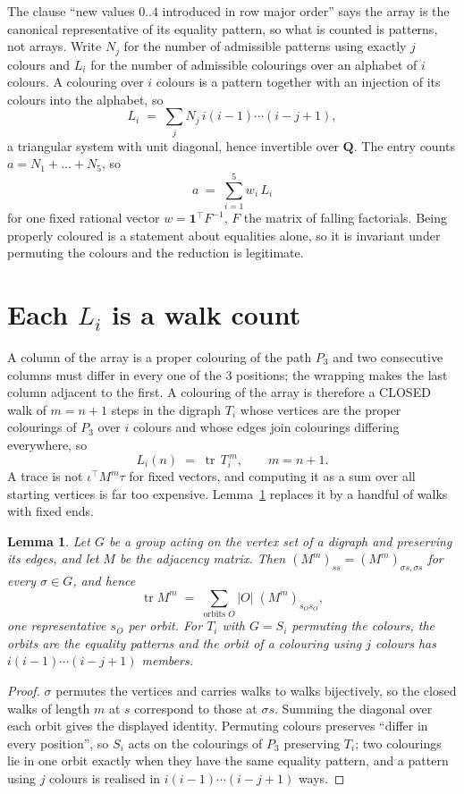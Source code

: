 \documentclass[11pt,a4paper]{article}
\theoremstyle{plain}
\newtheorem{lemma}[theorem]{Lemma}
\theoremstyle{definition}
\begin{document}
The clause ``new values $0..4$ introduced in row major order'' says the array is the
canonical representative of its equality pattern, so what is counted is patterns, not arrays.
Write $N_j$ for the number of admissible patterns using exactly $j$ colours and $L_i$ for the
number of admissible colourings over an alphabet of $i$ colours. A colouring over $i$ colours
is a pattern together with an injection of its colours into the alphabet, so
\[
L_i\;=\;\sum_j N_j\,i(i-1)\cdots(i-j+1),
\]
a triangular system with unit diagonal, hence invertible over $\mathbf{Q}$. The entry counts
$a=N_1+\dots+N_{5}$, so
\[
a\;=\;\sum_{i=1}^{5}w_i\,L_i
\]
for one fixed rational vector $w=\mathbf{1}^{\!\top}F^{-1}$, $F$ the matrix of falling
factorials. Being properly coloured is a statement about equalities alone, so it is invariant
under permuting the colours and the reduction is legitimate.

\section{Each $L_i$ is a walk count}

A column of the array is a proper colouring of the path $P_{3}$ and two consecutive
columns must differ in every one of the $3$ positions; the wrapping makes the last column
adjacent to the first. A colouring of the array is therefore a CLOSED walk of $m=n+1$ steps
in the digraph $T_i$ whose vertices are the proper colourings of $P_{3}$ over $i$ colours
and whose edges join colourings differing everywhere, so
\[
L_i(n)\;=\;\operatorname{tr}\,T_i^{\,m},\qquad m=n+1.
\]
A trace is not $\iota^{\!\top}M^m\tau$ for fixed vectors, and computing it as a sum over all
starting vertices is far too expensive. Lemma~\ref{lem:trace} replaces it by a handful of
walks with fixed ends.

\begin{lemma}\label{lem:trace}
Let $G$ be a group acting on the vertex set of a digraph and preserving its edges, and let $M$
be the adjacency matrix. Then $(M^m)_{ss}=(M^m)_{\sigma s,\sigma s}$ for every
$\sigma\in G$, and hence
\[
\operatorname{tr} M^m\;=\;\sum_{\text{orbits }O}|O|\;(M^m)_{s_O s_O} ,
\]
one representative $s_O$ per orbit. For $T_i$ with $G=S_i$ permuting the colours, the orbits
are the equality patterns and the orbit of a colouring using $j$ colours has
$i(i-1)\cdots(i-j+1)$ members.
\end{lemma}

\begin{proof}
$\sigma$ permutes the vertices and carries walks to walks bijectively, so the closed walks of
length $m$ at $s$ correspond to those at $\sigma s$. Summing the diagonal over each orbit
gives the displayed identity. Permuting colours preserves ``differ in every position'', so
$S_i$ acts on the colourings of $P_{3}$ preserving $T_i$; two colourings lie in one orbit
exactly when they have the same equality pattern, and a pattern using $j$ colours is realised
in $i(i-1)\cdots(i-j+1)$ ways.
\end{proof}
\end{document}
